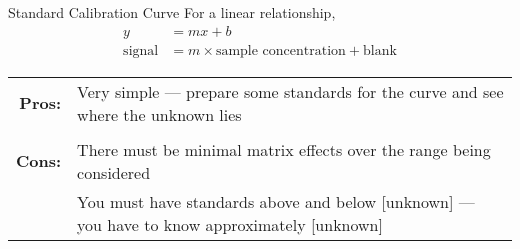 \documentclass[notes=show]{beamer}
\begin{document}
\begin{frame}{Standard Calibration Curve}
	For a \alert{linear} relationship,
	\begin{align*}
		y &= mx + b \\
		\text{signal} &= m \times \text{sample concentration} +
		\text{blank}
	\end{align*}

	\begin{tabularx}{\linewidth} {>{\bfseries}r X}
		Pros: &
		Very simple --- prepare some standards for the curve
		and see where the unknown lies \\ \\
		Cons: &
		There must be minimal \alert{matrix effects} over the
		range being considered \\
		      & You must have standards above and below
		      [unknown] --- you
			have to know approximately [unknown] \\
	\end{tabularx}
\end{frame}

\clearpage
\end{document}
